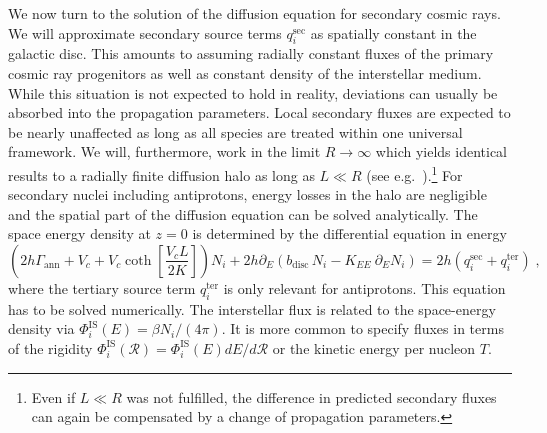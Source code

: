 \documentclass[a4paper,11pt]{article}
\newcommand{\R}{\mathcal{R}}
\begin{document}
We now turn to the solution of the diffusion equation for secondary cosmic rays. We will approximate secondary source terms $q^\text{sec}_{i}$ as spatially constant in the galactic disc. This amounts to assuming radially constant fluxes of the primary cosmic ray progenitors as well as constant density of the interstellar medium. While this situation is not expected to hold in reality, deviations can usually be absorbed into the propagation parameters. Local secondary fluxes are expected to be nearly unaffected as long as all species are treated within one universal framework. We will, furthermore, work in the limit $R\rightarrow \infty$ which yields identical results to a radially finite diffusion halo as long as $L\ll R$ (see e.g.~\cite{Putze:2010zn}).\footnote{Even if $L\ll R$ was not fulfilled, the difference in predicted secondary fluxes can again be compensated by a change of propagation parameters.} For secondary nuclei including antiprotons, energy losses in the halo are negligible and the spatial part of the diffusion equation can be solved analytically. The space energy density at $z=0$ is determined by the differential equation in energy \cite{Donato:2001ms,Maurin:2001sj}
\begin{equation}\label{eq:energyeq}
\left(2 h \Gamma_\text{ann} + V_c + V_c \coth{\left[ \frac{V_c L}{2 K}\right] }\right)N_i
 +  2 h \partial_E (b_\text{disc} \,N_i -K_{EE} \:\partial_E N_i ) =  2 h (q^\text{sec}_{i}+q^\text{ter}_{i})\;,
\end{equation}
where the tertiary source term $q^\text{ter}_{i}$ is only relevant for antiprotons. This equation has to be solved numerically. The interstellar flux is related to the space-energy density via $\Phi_i^\text{IS}(E)=\beta N_i /(4\pi)$. It is more common to specify fluxes in terms of the rigidity $\Phi_i^\text{IS}(\R)= \Phi_i^\text{IS}(E) dE/d\R$ or the kinetic energy per nucleon $T$.
\end{document}
